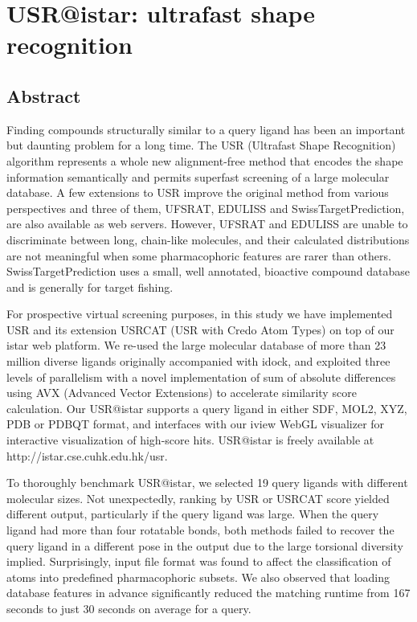 \chapter{USR@istar: ultrafast shape recognition}
\label{usr}

\section{Abstract}

Finding compounds structurally similar to a query ligand has been an important but daunting problem for a long time. The USR (Ultrafast Shape Recognition) algorithm represents a whole new alignment-free method that encodes the shape information semantically and permits superfast screening of a large molecular database. A few extensions to USR improve the original method from various perspectives and three of them, UFSRAT, EDULISS and SwissTargetPrediction, are also available as web servers. However, UFSRAT and EDULISS are unable to discriminate between long, chain-like molecules, and their calculated distributions are not meaningful when some pharmacophoric features are rarer than others. SwissTargetPrediction uses a small, well annotated, bioactive compound database and is generally for target fishing.

For prospective virtual screening purposes, in this study we have implemented USR and its extension USRCAT (USR with Credo Atom Types) on top of our istar web platform. We re-used the large molecular database of more than 23 million diverse ligands originally accompanied with idock, and exploited three levels of parallelism with a novel implementation of sum of absolute differences using AVX (Advanced Vector Extensions) to accelerate similarity score calculation. Our USR@istar supports a query ligand in either SDF, MOL2, XYZ, PDB or PDBQT format, and interfaces with our iview WebGL visualizer for interactive visualization of high-score hits. USR@istar is freely available at http://istar.cse.cuhk.edu.hk/usr.

To thoroughly benchmark USR@istar, we selected 19 query ligands with different molecular sizes. Not unexpectedly, ranking by USR or USRCAT score yielded different output, particularly if the query ligand was large. When the query ligand had more than four rotatable bonds, both methods failed to recover the query ligand in a different pose in the output due to the large torsional diversity implied. Surprisingly, input file format was found to affect the classification of atoms into predefined pharmacophoric subsets. We also observed that loading database features in advance significantly reduced the matching runtime from 167 seconds to just 30 seconds on average for a query.

